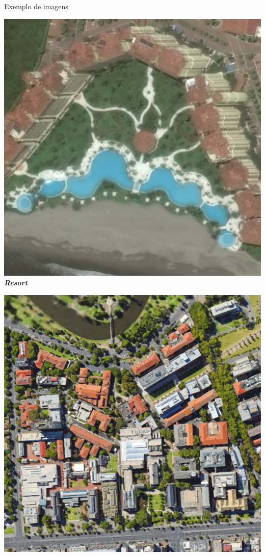     \begin{frame}{Exemplo de imagens}
        \centering
        \begin{minipage}[b]{0.3\linewidth}
            \centering
            \includegraphics[width=\textwidth]{AID/resort_123.jpg}
            \scriptsize \textbf{\textit{Resort}}
        \end{minipage}
        \hspace{0.03\linewidth}
        \begin{minipage}[b]{0.3\linewidth}
            \centering
            \includegraphics[width=\textwidth]{AID/school_66.jpg}

\end{minipage}
\end{frame}
